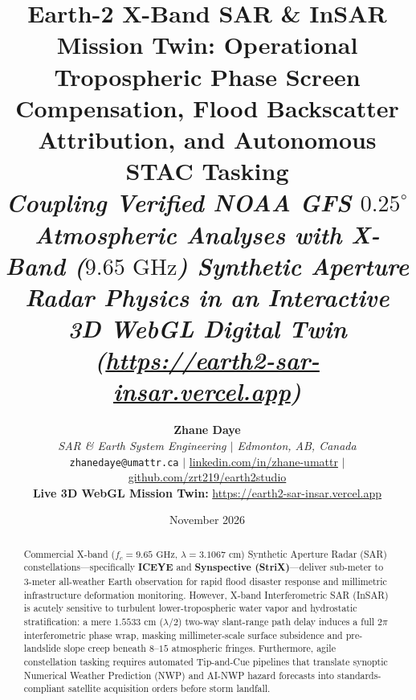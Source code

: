 \documentclass[10pt,twocolumn,letterpaper]{article}
\title{\vspace{-0.8cm}\textbf{\LARGE Earth-2 X-Band SAR \& InSAR Mission Twin: Operational Tropospheric Phase Screen Compensation, Flood Backscatter Attribution, and Autonomous STAC Tasking}\\
\vspace{0.2cm}
\large\textit{Coupling Verified NOAA GFS $0.25^\circ$ Atmospheric Analyses with X-Band ($9.65\text{ GHz}$) Synthetic Aperture Radar Physics in an Interactive 3D WebGL Digital Twin (\url{https://earth2-sar-insar.vercel.app})}}
\author{
    \textbf{Zhane Daye}\\
    \textit{SAR \& Earth System Engineering $|$ Edmonton, AB, Canada}\\
    \small \texttt{zhanedaye@umattr.ca} \quad $|$ \quad \href{https://www.linkedin.com/in/zhane-umattr}{linkedin.com/in/zhane-umattr} \quad $|$ \quad \href{https://github.com/zrt219/earth2studio}{github.com/zrt219/earth2studio}\\
    \small \textbf{Live 3D WebGL Mission Twin:} \url{https://earth2-sar-insar.vercel.app}
}
\date{November 2026}
\begin{document}
\maketitle
\thispagestyle{fancy}

\begin{abstract}
\noindent
Commercial X-band ($f_c = 9.65\text{ GHz}$, $\lambda = 3.1067\text{ cm}$) Synthetic Aperture Radar (SAR) constellations---specifically \textbf{ICEYE} and \textbf{Synspective (StriX)}---deliver sub-meter to 3-meter all-weather Earth observation for rapid flood disaster response and millimetric infrastructure deformation monitoring. However, X-band Interferometric SAR (InSAR) is acutely sensitive to turbulent lower-tropospheric water vapor and hydrostatic stratification: a mere $1.5533\text{ cm}$ ($\lambda/2$) two-way slant-range path delay induces a full $2\pi$ interferometric phase wrap, masking millimeter-scale surface subsidence and pre-landslide slope creep beneath $8\text{--}15$ atmospheric fringes. Furthermore, agile constellation tasking requires automated Tip-and-Cue pipelines that translate synoptic Numerical Weather Prediction (NWP) and AI-NWP hazard forecasts into standards-compliant satellite acquisition orders before storm landfall.


\end{abstract}
\end{document}
